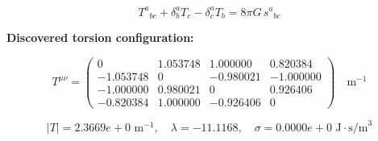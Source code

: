 
\begin{equation}
  T^a{}_{bc} + \delta^a_b T_c - \delta^a_c T_b = 8\pi G \, s^a{}_{bc}
\end{equation}

\textbf{Discovered torsion configuration:}

\begin{equation}
  T^{\mu\nu} = \begin{pmatrix}
    0 & 1.053748 & 1.000000 & 0.820384 \\
    -1.053748 & 0 & -0.980021 & -1.000000 \\
    -1.000000 & 0.980021 & 0 & 0.926406 \\
    -0.820384 & 1.000000 & -0.926406 & 0
  \end{pmatrix} \quad \text{m}^{-1}
\end{equation}

\begin{equation}
  |T| = 2.3669e+0 \text{ m}^{-1}, \quad
  \lambda = -11.1168, \quad
  \sigma = 0.0000e+0 \text{ J}\cdot\text{s/m}^3
\end{equation}